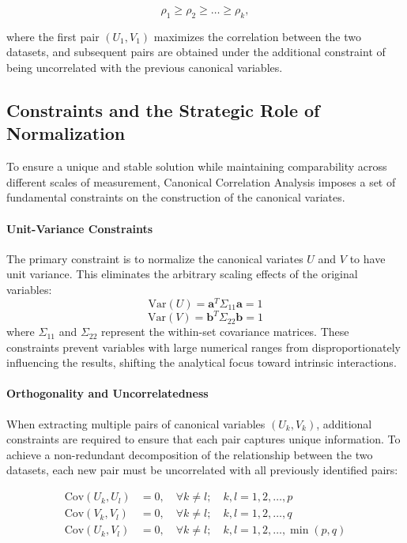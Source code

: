 \begin{equation}
\rho_1 \ge \rho_2 \ge \dots \ge \rho_k,
\end{equation}

where the first pair $(U_1,V_1)$ maximizes the correlation between the two datasets, and subsequent pairs are obtained under the additional constraint of being uncorrelated with the previous canonical variables.



\subsection{Constraints and the Strategic Role of Normalization}

To ensure a unique and stable solution while maintaining comparability across different scales of measurement, Canonical Correlation Analysis imposes a set of fundamental constraints on the construction of the canonical variates.

\paragraph{Unit-Variance Constraints}
The primary constraint is to normalize the canonical variates $U$ and $V$ to have unit variance. This eliminates the arbitrary scaling effects of the original variables:
\begin{equation}
\text{Var}(U) = \mathbf{a}^T \Sigma_{11} \mathbf{a} = 1
\end{equation}
\begin{equation}
\text{Var}(V) = \mathbf{b}^T \Sigma_{22} \mathbf{b} = 1
\end{equation}
where $\Sigma_{11}$ and $\Sigma_{22}$ represent the within-set covariance matrices. These constraints prevent variables with large numerical ranges from disproportionately influencing the results, shifting the analytical focus toward intrinsic interactions.

\paragraph{Orthogonality and Uncorrelatedness}
When extracting multiple pairs of canonical variables $(U_k, V_k)$, additional constraints are required to ensure that each pair captures unique information. To achieve a non-redundant decomposition of the relationship between the two datasets, each new pair must be uncorrelated with all previously identified pairs:

\begin{align}
    \text{Cov}(U_k, U_l) &= 0, \quad \forall k \neq l; \quad k, l = 1, 2, \dots, p \\
    \text{Cov}(V_k, V_l) &= 0, \quad \forall k \neq l; \quad k, l = 1, 2, \dots, q \\
    \text{Cov}(U_k, V_l) &= 0, \quad \forall k \neq l; \quad k, l = 1, 2, \dots, \min(p, q)
\end{align}



